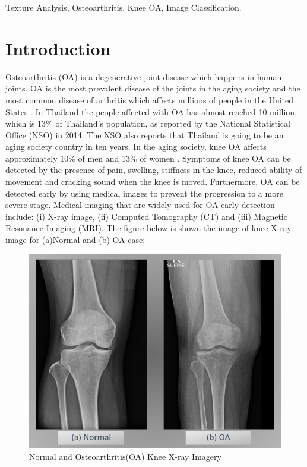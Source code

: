 \documentclass[review]{elsarticle}
\begin{document}
\begin{frontmatter}
\begin{keyword}
Texture Analysis, Osteoarthritis, Knee OA, Image Classification.
\end{keyword}

\end{frontmatter}

\linenumbers

\section{Introduction}

Osteoarthritis (OA) is a degenerative joint disease which happens in human joints. OA is the most prevalent disease of the joints in the aging society and the most common disease of arthritis which affects millions of people in the United States \cite{Factors2000}. In Thailand the people affected with OA has almost reached 10 million, which is 13\% of Thailand's population, as reported by the National Statistical Office (NSO) in 2014. The NSO also reports that Thailand is going to be an aging society country in ten years. In the aging society, knee OA affects approximately 10\% of men and 13\% of women \cite{BoneandJointInitiativeUSA2014}. Symptoms of knee OA can be detected by the presence of pain, swelling, stiffness in the knee, reduced ability of movement and cracking sound when the knee is moved. Furthermore, OA can be detected early by using medical images to prevent the progression to a more severe stage. Medical imaging that are widely used for OA early detection include: (i) X-ray image, (ii) Computed Tomography (CT) and (iii) Magnetic Resonance Imaging (MRI). The figure below is shown the image of knee X-ray image for (a)Normal and (b) OA case: \\
\begin{figure}[h]
	\centering
	\includegraphics[width=0.7\linewidth]{pic/picOA}
	\caption{Normal and Osteoarthritis(OA) Knee X-ray Imagery}
	\label{fig:picoa}
\end{figure}
\end{document}

